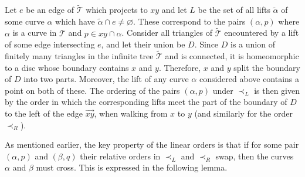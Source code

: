 \documentclass[11pt]{amsart}
\theoremstyle{definition}
\newcommand{\cT}{\mathcal{T}}
\begin{document}
Let $e$ be an edge of $\widetilde{\cT}$ which projects to $xy$ and let $L$ be the set of all lifts $\widetilde{\alpha}$ of some curve $\alpha$ which have $\widetilde{\alpha}\cap e\neq \varnothing$. These correspond to the pairs $(\alpha, p)$ where $\alpha$ is a curve in $\cT$ and $p\in xy\cap \alpha$. Consider all triangles of $\widetilde{\cT}$ encountered by a lift of some edge intersecting $e$, and let their union be $D$. Since $D$ is a union of finitely many triangles in the infinite tree $\widetilde{\cT}$ and is connected, it is homeomorphic to a disc whose boundary contains $x$ and $y$. Therefore, $x$ and $y$ split the boundary of $D$ into two parts. Moreover, the lift of any curve $\alpha$ considered above contains a point on both of these. The ordering of the pairs $(\alpha, p)$ under $\prec_L$ is then given by the order in which the corresponding lifts meet the part of the boundary of $D$ to the left of the edge $\vec{xy}$, when walking from $x$ to $y$ (and similarly for the order $\prec_R$).

\medskip


As mentioned earlier, the key property of the linear orders is that if for some pair $(\alpha, p)$ and $(\beta, q)$ their relative orders in $\prec_L$ and $\prec_R$ swap, then the curves $\alpha$ and $\beta$ must cross.
This is expressed in the following lemma.
\end{document}
